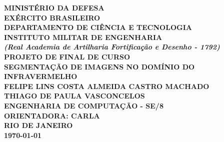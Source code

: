 \begin{titlepage}
\begin{center}\large
\textbf{MINISTÉRIO DA DEFESA\\ %
EXÉRCITO BRASILEIRO\\
DEPARTAMENTO DE CIÊNCIA E TECNOLOGIA\\
INSTITUTO MILITAR DE ENGENHARIA\\
\textit{(Real Academia de Artilharia Fortificação e Desenho - 1792)}\\ %
PROJETO DE FINAL DE CURSO\\ \vspace{2cm}
\textbf{SEGMENTAÇÃO DE IMAGENS NO DOMÍNIO DO INFRAVERMELHO}\\ \vspace{3.5cm} 
\textnormal{FELIPE LINS COSTA ALMEIDA CASTRO \textbf{MACHADO}\\
\textbf{THIAGO} DE PAULA \textbf{VASCONCELOS}\\
\vspace{2cm}}
ENGENHARIA DE COMPUTAÇÃO - SE/8\\ \vspace{5cm}
ORIENTADORA: CARLA\\ \vspace{2.5cm}
RIO DE JANEIRO\\\today{}}
\end{center}
\end{titlepage}
